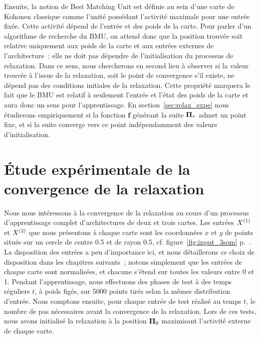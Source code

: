 \documentclass[../main]{subfiles}
\begin{document}
Ensuite, la notion de Best Matching Unit est définie au sein d'une carte de Kohonen classique comme l'unité possédant l'activité maximale pour une entrée fixée. Cette activité dépend de l'entrée et des poids de la carte.
Pour parler d'un algorithme de recherche du BMU, on attend donc que la position trouvée soit relative uniquement aux poids de la carte et aux entrées externes de l'architecture~: elle ne doit pas dépendre de l'initialisation du processus de relaxation.
Dans ce sens, nous chercherons en second lieu à observer si la valeur trouvée à l'issue de la relaxation, soit le point de convergence s'il existe, ne dépend pas des conditions initiales de la relaxation.
Cette propriété marquera le fait que le BMU est relatif à seulement l'entrée et l'état des poids de la carte et aura donc un sens pour l'apprentissage.
En section~\ref{sec:relax_expe} nous étudierons empiriquement si la fonction $\mathbf{f}$ générant la suite $\mathbf{\Pi}_\tau$ admet un point fixe, et si la suite converge vers ce point indépendamment des valeurs d'initialisation.

\section{\'Etude expérimentale de la convergence de la relaxation}\label{sec:relax_conv}

Nous nous intéressons à la convergence de la relaxation au cours d'un processus d'apprentissage complet d'architectures de deux et trois cartes. 
Les entrées $X^{({1})}$ et $X^{({2})}$ que nous présentons à chaque carte sont les coordonnées $x$ et $y$ de points situés sur un cercle de centre 0.5 et de rayon 0.5, cf. figure~\ref{fig:input_3som} p.~\pageref{fig:input_3som}. La disposition des entrées a peu d'importance ici, et nous détaillerons ce choix de disposition dans les chapitres suivants~; notons simplement que les entrées de chaque carte sont normalisées, et chacune s'étend sur toutes les valeurs entre 0 et 1.
Pendant l'apprentissage, nous effectuons des phases de test à des temps réguliers $t$, à poids figés, sur 5000 points tirés selon la mêmes distribution d'entrée. 
Nous comptons ensuite, pour chaque entrée de test réalisé au temps $t$, le nombre de pas nécessaires avant la convergence de la relaxation. Lors de ces tests, nous avons initialisé la relaxation à la position $\mathbf{\Pi}_0$ maximisant l'activité externe de chaque carte.
\end{document}
